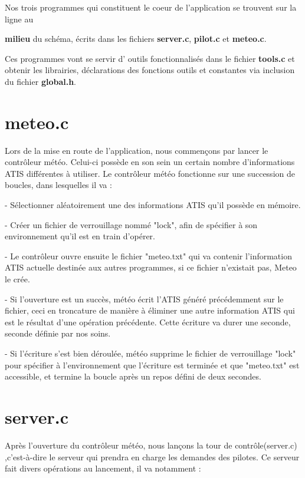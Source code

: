 \documentclass{report}
\begin{document}
		Nos trois programmes qui constituent le coeur de l'application se trouvent sur la ligne au {\textbf{milieu} du schéma, écrits dans les fichiers {\textbf{\color{red} server.c}}, {      \textbf{\color{red} pilot.c}} et {\textbf{\color{red} meteo.c}}.

		Ces programmes vont se servir d' \og outils \fg fonctionnalisés dans le fichier {\textbf{\color{red} tools.c}} et obtenir les librairies, déclarations des fonctions outils et constantes  via inclusion du fichier {\textbf{\color{black} global.h}}.

	\section{meteo.c}

		Lors de la mise en route de l'application, nous commençons par lancer le contrôleur météo.
		Celui-ci possède en son sein un certain nombre d'informations ATIS différentes à utiliser.
		Le contrôleur météo fonctionne sur une succession de boucles, dans lesquelles il va :

		- Sélectionner aléatoirement une des informations ATIS qu'il possède en mémoire.

		- Créer un fichier de verrouillage nommé "lock", afin de spécifier à son environnement qu'il est en train d'opérer.

		- Le contrôleur ouvre ensuite le fichier "meteo.txt" qui va contenir l'information ATIS actuelle destinée aux autres programmes, si ce fichier n'existait pas, Meteo le crée.

		- Si l'ouverture est un succès, météo écrit l'ATIS généré précédemment sur le fichier, ceci en troncature de manière à éliminer une autre information ATIS qui est le résultat d'une opération précédente. Cette écriture va durer une seconde, seconde définie par nos soins.

		- Si l'écriture s'est bien déroulée, météo supprime le fichier de verrouillage "lock" pour spécifier à l'environnement que l'écriture est terminée et que "meteo.txt" est accessible, et termine la boucle après un repos défini de deux secondes.

	\section{server.c}

		Après l'ouverture du contrôleur météo, nous lançons la tour de contrôle(server.c) ,c'est-à-dire le serveur qui prendra en charge les demandes des pilotes.
		Ce serveur fait divers opérations au lancement, il va notamment : 

}
\end{document}
